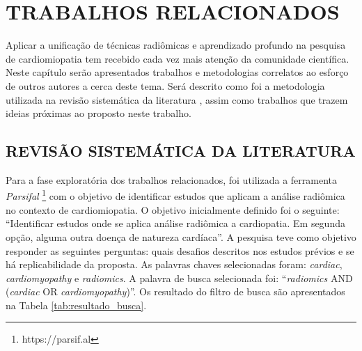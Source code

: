 \chapter{TRABALHOS RELACIONADOS} 
\label{chap:trab_relacionados}


Aplicar a unificação de técnicas radiômicas e aprendizado profundo na pesquisa de cardiomiopatia tem recebido cada vez mais atenção da comunidade científica.
Neste capítulo serão apresentados trabalhos e metodologias correlatos ao esforço de outros autores a cerca deste tema. Será descrito como foi a metodologia utilizada na revisão sistemática da literatura \cite{petersenGuidelinesConductingSystematic2015a}, assim como trabalhos que trazem ideias próximas ao proposto neste trabalho.

\section{REVISÃO SISTEMÁTICA DA LITERATURA} 
\label{sec:rev_sistematica}

Para a fase exploratória dos trabalhos relacionados, foi utilizada a ferramenta \textit{Parsifal} \footnote{https://parsif.al} com o objetivo de identificar estudos que aplicam a análise radiômica no contexto de cardiomiopatia. O objetivo inicialmente definido foi o seguinte: ``Identificar estudos onde se aplica análise radiômica a cardiopatia. Em segunda opção, alguma outra doença de natureza cardíaca''. A pesquisa teve como objetivo responder as seguintes perguntas: quais desafios descritos nos estudos prévios e se há replicabilidade da proposta. As palavras chaves selecionadas foram: \textit{cardiac}, \textit{cardiomyopathy} e \textit{radiomics}. A palavra de busca selecionada foi: ``\textit{radiomics} AND (\textit{cardiac} OR \textit{cardiomyopathy})''. Os resultado do filtro de busca são apresentados na Tabela \ref{tab:resultado_busca}. 
\newline

